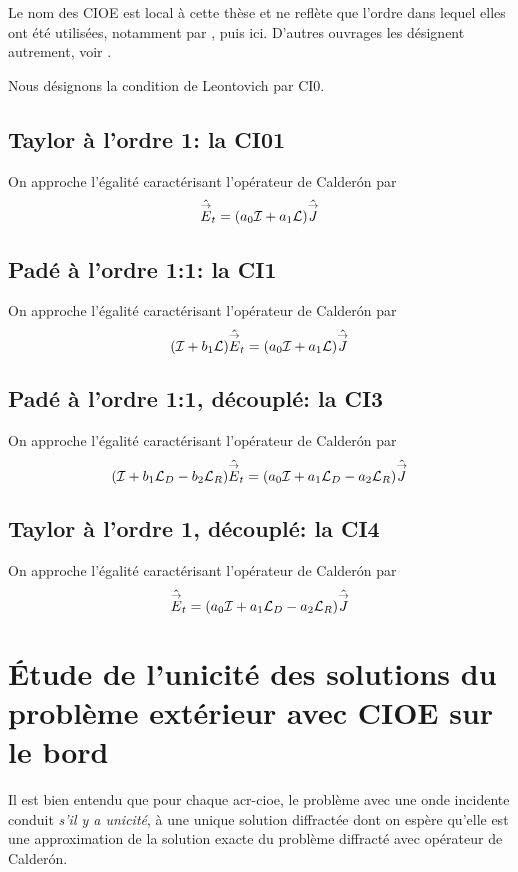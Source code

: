     Le nom des CIOE est local à cette thèse et ne reflète que l'ordre dans lequel elles ont été utilisées, notamment par \cite{stupfel_sufficient_2011}, puis ici.
    D'autres ouvrages les désignent autrement, voir \cite{hoppe_higher_1994,senior_approximate_1995,aubakirov_electromagnetic_2014}.
      
    Nous désignons la condition de Leontovich par CI0.

  \subsection{Taylor à l'ordre 1: la CI01}

    On approche l'égalité caractérisant l'opérateur de Calderón par
    \[
      \hat{{\overset{\rightarrow}{E}}}_t = ( a_0{\mathcal{I}} + a_1 \mathcal{L} ) \hat {{\overset{\rightarrow}{J}}}
    \]

  \subsection{Padé à l'ordre 1:1: la CI1}

    On approche l'égalité caractérisant l'opérateur de Calderón par
    \[
      ( {\mathcal{I}} + b_1 \mathcal{L} )\hat{{\overset{\rightarrow}{E}}}_t = ( a_0{\mathcal{I}} + a_1 \mathcal{L} ) \hat {{\overset{\rightarrow}{J}}}
    \]

  \subsection{Padé à l'ordre 1:1, découplé: la CI3}

    On approche l'égalité caractérisant l'opérateur de Calderón par
    \[
      ( {\mathcal{I}} + b_1 {\mathcal{L}_D} -b_2 {\mathcal{L}_R} )\hat{{\overset{\rightarrow}{E}}}_t = ( a_0{\mathcal{I}} + a_1 {\mathcal{L}_D} -a_2 {\mathcal{L}_R}) \hat {{\overset{\rightarrow}{J}}}
    \]

  \subsection{Taylor à l'ordre 1, découplé: la CI4}

    On approche l'égalité caractérisant l'opérateur de Calderón par
    \[
      \hat{{\overset{\rightarrow}{E}}}_t = ( a_0{\mathcal{I}} + a_1 {\mathcal{L}_D} - a_2 {\mathcal{L}_R} ) \hat {{\overset{\rightarrow}{J}}}
    \]

\section{Étude de l'unicité des solutions du problème extérieur avec CIOE sur le bord}

  Il est bien entendu que pour chaque \gls{acr-cioe}, le problème avec une onde incidente conduit \emph{s'il y a unicité}, à une unique solution diffractée dont on espère qu'elle est une approximation de la solution exacte du problème diffracté avec opérateur de Calderón.

